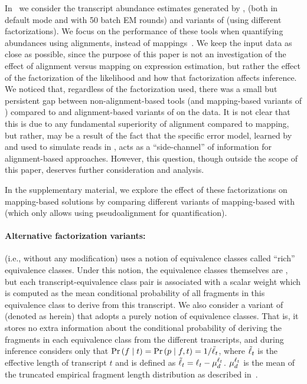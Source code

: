 In~ we consider the transcript
abundance estimates generated by \rsem, \express (both in default mode and with 
50 batch EM rounds) and variants of \salmon (using different factorizations). 
We focus on the performance of these tools when quantifying
abundances using alignments, instead of mappings~\citep{Srivastava2016rapmap}.
We keep the input data as close as possible, since the purpose of this paper is
not an investigation of the effect of alignment versus mapping on expression
estimation, but rather the effect of the factorization of the likelihood and how
that factorization affects inference. We noticed that, regardless of the
factorization used, there was a small but persistent gap between non-alignment-based
tools (\kallisto and mapping-based variants of \salmon) compared to \rsem and 
alignment-based variants of \salmon on the \rsemsim data. It is not clear that 
this is due to any fundamental superiority of alignment compared to mapping, 
but rather, may be a result of the fact that the specific error model, learned 
by \rsem and used to simulate reads in \rsemsim, acts as a ``side-channel'' of 
information for alignment-based approaches.  However, this question, though 
outside the scope of this paper, deserves further consideration and analysis.

In the supplementary material, we explore the effect of these factorizations on
mapping-based solutions by comparing different variants of mapping-based \salmon
with \kallisto (which only allows using pseudoalignment for quantification).

\paragraph{Alternative factorization variants:} \salmon (i.e., without any
modification) uses a \cb notion of equivalence classes called ``rich''
equivalence classes. Under this notion, the equivalence classes themselves are
\cb, but each transcript-equivalence class pair is associated with a scalar
weight which is computed as the mean conditional probability of all fragments in
this equivalence class to derive from this transcript. We also consider a
variant of \salmon (denoted as \salmonu herein) that adopts a purely \cb notion
of equivalence classes. That is, it stores no extra information about the
conditional probability of deriving the fragments in each equivalence class from
the different transcripts, and during inference considers only that $\Prob{f}{t}
= \Prob{p}{f,t} = 1 / \elength{t}$, where $\tilde{\ell}_{t}$ is the effective length
of transcript $t$ and is defined as $\tilde{\ell}_{t} = \ell_{t}-
\mu_d^{\ell_{t}}$. $\mu_d^{\ell_{t}}$ is the mean of the truncated empirical
fragment length distribution as described in~\citep{Patro2017Salmon}.

